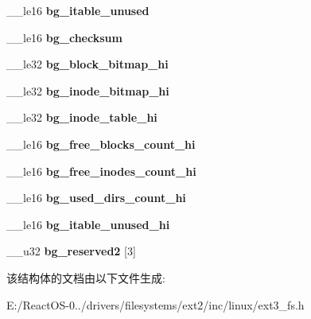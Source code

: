 \begin{DoxyCompactItemize}
\mbox{\label{structext4__group__desc_a3fd019c0ade348fdd128084d761875e4}} 
\+\_\+\+\_\+le16 {\bfseries bg\+\_\+itable\+\_\+unused}
\item 
\mbox{\label{structext4__group__desc_a5fdae4d64d663bfe5414529e318e42b3}} 
\+\_\+\+\_\+le16 {\bfseries bg\+\_\+checksum}
\item 
\mbox{\label{structext4__group__desc_aabacffd9a7f5a56bfac8196fbaa2f044}} 
\+\_\+\+\_\+le32 {\bfseries bg\+\_\+block\+\_\+bitmap\+\_\+hi}
\item 
\mbox{\label{structext4__group__desc_abbdd09d7d4cc9f85d076670a84d05a31}} 
\+\_\+\+\_\+le32 {\bfseries bg\+\_\+inode\+\_\+bitmap\+\_\+hi}
\item 
\mbox{\label{structext4__group__desc_a479ef94a150f1ed5cecc53ce6678bbd9}} 
\+\_\+\+\_\+le32 {\bfseries bg\+\_\+inode\+\_\+table\+\_\+hi}
\item 
\mbox{\label{structext4__group__desc_ad6eeed6e87070f074d8a75475b14c138}} 
\+\_\+\+\_\+le16 {\bfseries bg\+\_\+free\+\_\+blocks\+\_\+count\+\_\+hi}
\item 
\mbox{\label{structext4__group__desc_a9f4578f88827d50a4255602cbfd083ba}} 
\+\_\+\+\_\+le16 {\bfseries bg\+\_\+free\+\_\+inodes\+\_\+count\+\_\+hi}
\item 
\mbox{\label{structext4__group__desc_a64ba038ffa4ac62b0a76ff310cba4c63}} 
\+\_\+\+\_\+le16 {\bfseries bg\+\_\+used\+\_\+dirs\+\_\+count\+\_\+hi}
\item 
\mbox{\label{structext4__group__desc_ad4c9293571959b1db2ea6812159f9f63}} 
\+\_\+\+\_\+le16 {\bfseries bg\+\_\+itable\+\_\+unused\+\_\+hi}
\item 
\mbox{\label{structext4__group__desc_a67d792ed1d01be8b604387f97b236b80}} 
\+\_\+\+\_\+u32 {\bfseries bg\+\_\+reserved2} \mbox{[}3\mbox{]}
\end{DoxyCompactItemize}


该结构体的文档由以下文件生成\+:\begin{DoxyCompactItemize}
\item 
E\+:/\+React\+O\+S-\/0../drivers/filesystems/ext2/inc/linux/ext3\+\_\+fs.\+h\end{DoxyCompactItemize}
